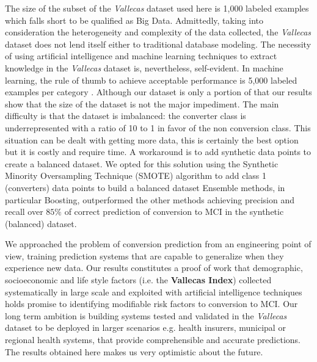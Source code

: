 \documentclass[11pt]{article}
\theoremstyle{definition}
\theoremstyle{remark}
\begin{document}
The size of the subset of the \emph{Vallecas} dataset used here is 1,000 labeled examples which falls short to be qualified as Big Data. Admittedly, taking into consideration the heterogeneity and complexity of the data collected, the \emph{Vallecas} dataset does not lend itself either to traditional database modeling. The necessity of using artificial intelligence and machine learning techniques to extract knowledge in the \emph{Vallecas} dataset is, nevertheless, self-evident.
In machine learning, the rule of thumb to achieve acceptable performance is 5,000 labeled examples per category \cite{goodfellow2016deep}. Although our dataset is only a portion of that our results show that the size of the dataset is not the major impediment. The main difficulty is that the dataset is imbalanced: the converter class is underrepresented with a ratio of 10 to 1 in favor of the non conversion class. This situation can be dealt with getting more data, this is certainly the best option but it is costly and require time. A workaround is to add synthetic data points to create a balanced dataset. We opted for this solution using the Synthetic Minority Oversampling Technique (SMOTE) algorithm to add class 1 (converters) data points to build a balanced dataset
Ensemble methods, in particular Boosting, outperformed the other methods achieving precision and recall over $85\%$ of correct prediction of conversion to MCI in the synthetic (balanced) dataset. 

We approached the problem of conversion prediction from an engineering point of view, training prediction systems that are capable to generalize when they experience new data. Our results constitutes a proof of work that demographic, socioeconomic and life style factors (i.e. the \textbf{Vallecas Index}) collected systematically in large scale and exploited with artificial intelligence techniques holds promise to identifying modifiable risk factors to conversion to MCI. 
Our long term ambition is building systems tested and validated in the \textit{Vallecas} dataset to be deployed in larger scenarios e.g. health insurers, municipal or regional health systems, that provide comprehensible and accurate predictions. 
The results obtained here makes us very optimistic about the future. 

\newpage





\end{document}
